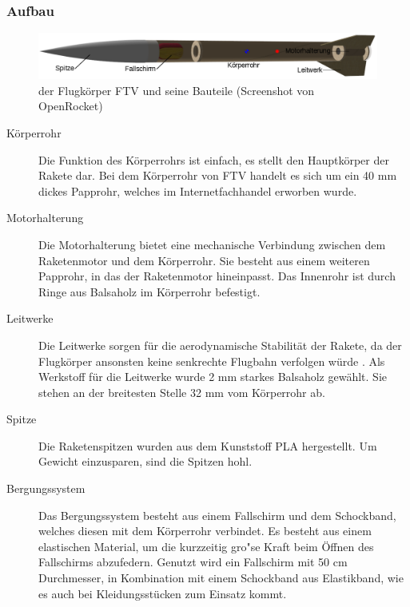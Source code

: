 \documentclass[10pt,a4paper]{article}
\begin{document}
\subsubsection{Aufbau}

\begin{figure}[ht]
	\includegraphics[width=15cm]{Bilder/Bauteile-von-FTV.png}
	\caption{der Flugkörper FTV und seine Bauteile (Screenshot von OpenRocket)}
	\centering
\end{figure}

\begin{description}
	\item[Körperrohr] Die Funktion des Körperrohrs ist einfach, es stellt den Hauptkörper der Rakete dar. Bei dem Körperrohr von FTV handelt es sich um ein 40 mm dickes Papprohr, welches im Internetfachhandel erworben wurde.
	
	\item[Motorhalterung] Die Motorhalterung bietet eine mechanische Verbindung zwischen dem Raketenmotor und dem Körperrohr. Sie besteht aus einem weiteren Papprohr, in das der Raketenmotor hineinpasst. Das Innenrohr ist durch Ringe aus Balsaholz im Körperrohr befestigt.
	
	\item[Leitwerke] Die Leitwerke sorgen für die aerodynamische Stabilität der Rakete, da der Flugkörper ansonsten keine senkrechte Flugbahn verfolgen würde \cite{om}. Als Werkstoff für die Leitwerke wurde 2 mm starkes Balsaholz gewählt. Sie stehen an der breitesten Stelle 32 mm vom Körperrohr ab.
	
	\item[Spitze] Die Raketenspitzen wurden aus dem Kunststoff PLA hergestellt. Um Gewicht einzusparen, sind die Spitzen hohl.
	
	\item[Bergungssystem] Das Bergungssystem besteht aus einem Fallschirm und dem Schockband, welches diesen mit dem Körperrohr verbindet. Es besteht aus einem elastischen Material, um die kurzzeitig gro"se Kraft beim Öffnen des Fallschirms abzufedern. Genutzt wird ein Fallschirm mit 50 cm Durchmesser, in Kombination mit einem Schockband aus Elastikband, wie es auch bei Kleidungsstücken zum Einsatz kommt.
\end{description}
\end{document}
